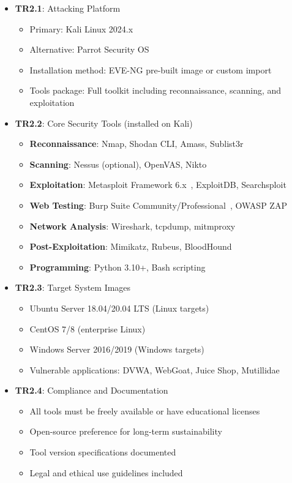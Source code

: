 \begin{itemize}

\item \textbf{TR2.1}: Attacking Platform
\begin{itemize}
\item Primary: Kali Linux 2024.x~\cite{kali_linux}
\item Alternative: Parrot Security OS~\cite{parrot_os}
\item Installation method: EVE-NG pre-built image or custom import
\item Tools package: Full toolkit including reconnaissance, scanning, and exploitation
\end{itemize}

\item \textbf{TR2.2}: Core Security Tools (installed on Kali)
\begin{itemize}
\item \textbf{Reconnaissance}: Nmap, Shodan CLI, Amass, Sublist3r
\item \textbf{Scanning}: Nessus (optional), OpenVAS, Nikto
\item \textbf{Exploitation}: Metasploit Framework 6.x~\cite{metasploit}, ExploitDB, Searchsploit
\item \textbf{Web Testing}: Burp Suite Community/Professional~\cite{burp_suite}, OWASP ZAP~\cite{owasp_zap}
\item \textbf{Network Analysis}: Wireshark\cite{wireshark}, tcpdump, mitmproxy
\item \textbf{Post-Exploitation}: Mimikatz, Rubeus, BloodHound
\item \textbf{Programming}: Python 3.10+, Bash scripting
\end{itemize}

\item \textbf{TR2.3}: Target System Images
\begin{itemize}
\item Ubuntu Server 18.04/20.04 LTS (Linux targets)
\item CentOS 7/8 (enterprise Linux)
\item Windows Server 2016/2019 (Windows targets)
\item Vulnerable applications: DVWA, WebGoat, Juice Shop, Mutillidae
\end{itemize}

\item \textbf{TR2.4}: Compliance and Documentation
\begin{itemize}
\item All tools must be freely available or have educational licenses
\item Open-source preference for long-term sustainability
\item Tool version specifications documented
\item Legal and ethical use guidelines included
\end{itemize}

\end{itemize}


